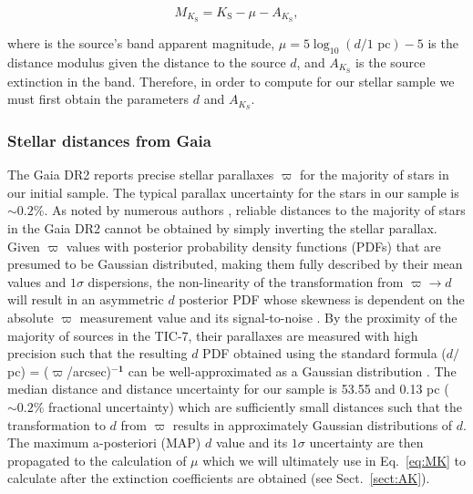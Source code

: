 \begin{equation}
  M_{K_{\text{S}}} = K_{\text{S}} - \mu - A_{K_{\text{S}}}, \label{eq:MK}
\end{equation}

\noindent where \Ks{} is the source's \Ks{-}band apparent magnitude, $\mu = 5\log_{10}{(d/\text{1 pc})} - 5$
is the distance modulus given the distance to the source $d$, and $A_{K_{\text{S}}}$ is the source extinction in the
\Ks{-}band. Therefore, in order to compute \MK{} for our stellar sample we must first obtain the parameters $d$ and
$A_{K_S}$.

\subsubsection{Stellar distances from Gaia}
The Gaia DR2 reports precise stellar parallaxes $\varpi$ for the majority of stars in our initial sample.
The typical parallax uncertainty for the stars in our sample is $\sim 0.2$\%.
As noted by numerous authors \citep[e.g.][]{bailorjones15,astraatmadja16,luri18}, reliable distances to the
majority of stars in the Gaia DR2 cannot be obtained by simply inverting the stellar parallax. Given $\varpi$
values with posterior probability density functions (PDFs) that are presumed to be Gaussian distributed, making them
fully described by their mean values and $1\sigma$ dispersions, the non-linearity
of the transformation from $\varpi \to d$ will result in an asymmetric $d$ posterior PDF whose skewness
is dependent on the absolute $\varpi$ measurement value and its signal-to-noise \citep{luri18}.
By the proximity of the majority of sources in the TIC-7, their parallaxes are measured with high precision such
that the resulting $d$ PDF obtained using the standard formula ($d/$ pc) = ($\varpi$/arcsec)$\mathbf{^{-1}}$
can be well-approximated as a Gaussian distribution \citep{bailorjones18}.
The median distance and distance uncertainty for our sample is 53.55 and 0.13 pc ($\sim 0.2$\% fractional uncertainty)
which are sufficiently small distances such that the transformation to $d$ from $\varpi$ results in approximately
Gaussian distributions of $d$.
The maximum a-posteriori (MAP) $d$ value and its $1\sigma$
uncertainty are then propagated to the calculation of $\mu$ which we will ultimately use in Eq.~\ref{eq:MK} to
calculate \MK{} after the extinction coefficients are obtained (see Sect.~\ref{sect:AK}). \\

